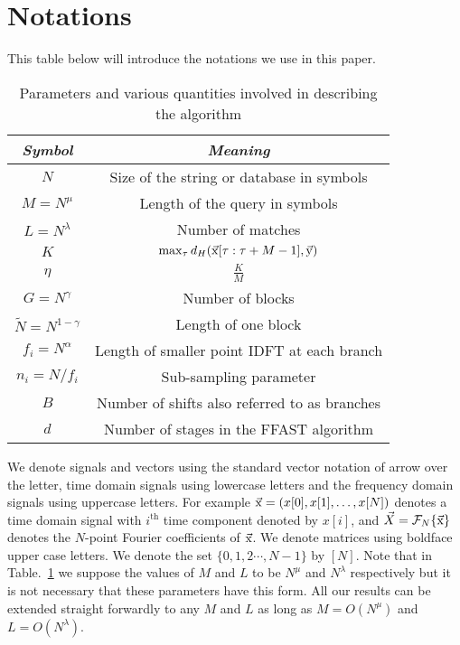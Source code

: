 \section{Notations}
This table below will introduce the notations we use in this paper.
\begin{table}[h!]
\begin{center}
	\begin{tabular}{|c|c|} 	
		\hline		
		\textit{Symbol}				        &  \textit{Meaning} \\		
		\hline
		$N$           				& Size of the string or database in symbols \\
		\hline
		$M = N^{\mu}$       & Length of the query in symbols \\
		\hline
        $L = N^\lambda$    &   Number of matches \\
        \hline
        $K$             &$\max_{\tau}d_{H}(\vec{\mathrm{x}}[\tau:\tau+M-1],\vec{\mathrm{y}})$\\
        \hline
	    $\eta$             &$\frac{K}{M}$\\
	    \hline
		$G = N^\gamma$    & Number of blocks \\
		\hline
		$\tilde{N} = N^{1-\gamma}$   & Length of one block \\
		\hline
		$f_i = N^\alpha$     & Length of smaller point IDFT at each branch\\
		\hline
		$n_i = N/f_i$     	   &  Sub-sampling parameter \\
		\hline
		$B$   					    & Number of shifts also referred to as branches  \\
		\hline
		$d$           				& Number of stages in the FFAST algorithm \\
		\hline
	\end{tabular}
\end{center}	
\caption{Parameters and various quantities involved in describing the algorithm}
\label{Table:Notations}
\end{table}	
We denote signals and vectors using the standard vector notation of arrow over the letter, time domain signals using lowercase letters and the frequency domain signals using uppercase letters. For example $\vec{\mathrm{x}} = (x[0], x[1], \ldots, x[N] )$ denotes a time domain signal with $i^{\text{th}}$ time component denoted by $x[i]$, and $\vec{X}= \mathcal{F}_{N}\{\vec{\mathrm{x}}\}$ denotes the $N$-point Fourier coefficients of $\vec{\mathrm{x}}$. We denote matrices using boldface upper case letters. We denote the set $\{0,1,2\cdots, N-1\}$ by $[N]$. Note that in Table.~\ref{Table:Notations} we suppose the values of $M$ and $L$ to be $N^{\mu}$ and $N^{\lambda}$ respectively but it is not necessary that these parameters have this form. All our results can be extended straight forwardly to any $M$ and $L$ as long as $M=O(N^{\mu})$ and $L=O(N^{\lambda})$.
